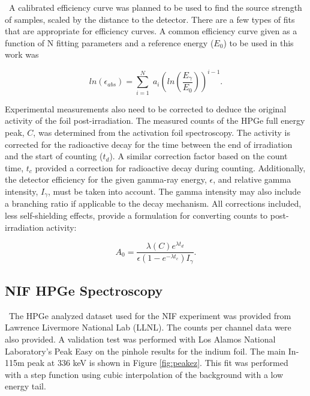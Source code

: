 \documentclass[journal]{IEEEtran}
\begin{document}
\ A calibrated efficiency curve was planned to be used to find the source strength of samples, scaled by the distance to the detector. There are a few types of fits that are appropriate for efficiency curves. A common efficiency curve given as a function of N fitting parameters and a reference energy ($E_{0}$) to be used in this work was

\begin{equation} \label{eq:effa1}
	ln(\epsilon_{abs}) =   \sum_{i=1}^{N} \; a_{i} (ln(\dfrac{E_{\gamma}}{E_{0}}))^{i-1}.
\end{equation}

Experimental measurements also need to be corrected to deduce the original activity of the foil post-irradiation. The measured counts of the HPGe full energy peak, $C$, was determined from the activation foil spectroscopy. The activity is corrected for the radioactive decay for the time between the end of irradiation and the start of counting ($t_{d}$). A similar correction factor based on the count time, $t_{c}$ provided a correction for radioactive decay during counting. Additionally, the detector efficiency for the given gamma-ray energy, $\epsilon$, and relative gamma intensity, $I_{\gamma}$, must be taken into account. The gamma intensity may also include a branching ratio if applicable to the decay mechanism. All corrections included, less self-shielding effects, provide a formulation for converting counts to post-irradiation activity: 

\begin{equation} \label{eq:MeasActivity}
A_{0} = \frac{\lambda (C) e^{\lambda t_{d}}}{\epsilon (1-e^{-\lambda t_{c}})I_{\gamma}}.
\end{equation}

\subsection{NIF HPGe Spectroscopy}

\ The HPGe analyzed dataset used for the NIF experiment was provided from Lawrence Livermore National Lab (LLNL). The counts per channel data were also provided. A validation test was performed with Los Alamos National Laboratory's Peak Easy on the pinhole results for the indium foil\cite{PeakEZ}. The main In-115m peak at 336 keV is shown in Figure \ref{fig:peakez}. This fit was performed with a step function using cubic interpolation of the background with a low energy tail. 
\end{document}
